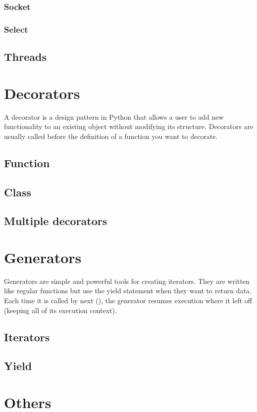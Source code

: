 \documentclass[a4paper, 12pt]{article}
\begin{document}
\subsubsection{Socket}
\subsubsection{Select}
\subsection{Threads}

\newpage
\section{Decorators}
A decorator is a design pattern in Python that allows a user to add new functionality to an existing object without modifying its structure. Decorators are usually called before the definition of a function you want to decorate.\newline
\subsection{Function}
\subsection{Class}
\subsection{Multiple decorators}

\newpage
\section{Generators}
Generators are simple and powerful tools for creating iterators. They are written like regular functions but use the yield statement when they want to return data. Each time it is called by next (), the generator resumes execution where it left off (keeping all of its execution context).\newline
\subsection{Iterators}
\subsection{Yield}

\newpage
\section{Others}
\end{document}
